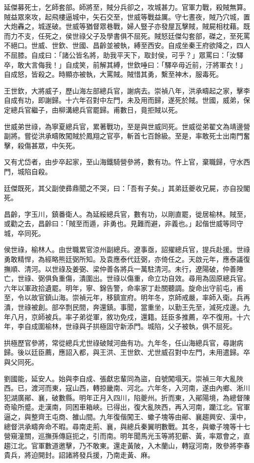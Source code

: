 \begin{pinyinscope}
延傑募死士，乞師套部。師將至，賊分兵卻之，攻城甚力。官軍力戰，殺賊無算。賊益眾來攻，起飛樓逼城中，矢石交至，世威等戰益厲。守七晝夜，賊乃穴城，置大炮轟之，城遂破。世威等猶督眾巷戰，婦人豎子亦發屋瓦擊賊，賊屍相枕藉。既而力不支，任死之，侯世祿父子及學書俱不屈死。賊怒廷傑勾套部，磔之，至死罵不絕口。世威、世欽、世國、昌齡並被執，縛至西安。自成坐秦王府欲降之，四人不屈膝。自成曰：「諸公皆名將，助我平天下，取封侯，可乎？」眾罵曰：「汝驛卒，敢大言侮我！」自成笑，前解其縛，世欽唾曰：「驛卒毋近前，汙將軍衣！」自成怒，皆殺之。時顯亦被執，大罵賊。賊惜其勇，繫至神木，服毒死。

王世欽，大將威子，歷山海左部總兵官，謝病去。崇禎八年，洪承疇起之家，擊李自成有功，即謝歸。十六年召對中左門，未及用而歸，遂死於賊。世國，威弟，保定總兵官繼子，由柳溝總兵官罷歸。甫數日，竟拒賊以死。

世威弟世祿，為寧夏總兵官，累著戰功，至是與世威同死。世威從弟翟文為靖邊營副將。嘗從洪承疇敗闖賊於鳳翔之官亭，斬首七百餘級。至是，率敢死士出南門奮擊，殺傷甚眾，中矢死。

又有尤岱者，由步卒起家，至山海鐵騎營參將，數有功。忤上官，棄職歸，守水西門，城陷自殺。

廷傑既死，其父副使彞鼎聞之不哭，曰：「吾有子矣。」其弟廷夔收兄屍，亦自投閣死。

昌齡，字玉川，鎮番衛人。為延綏總兵官，數有功，以剛直罷，徙居榆林。賊至，或勸之去，昌齡曰：「賊至而遁，非勇也。見難而避，非義也。」起偕世威等同守城，卒同死。

侯世祿，榆林人。由世職累官涼州副總兵。遼事亟，詔擢總兵官，提兵赴援。世祿勇敢精悍，為經略熊廷弼所知。及袁應泰代廷弼，亦倚任之。天啟元年，應泰議復撫順、清河。以世祿及姜弼、梁仲善各將兵一萬駐清河。未行，遼陽破，仲善陣亡，世祿、弼俱負重傷，潰圍出。世祿以傷重，命立功自效。尋用為固原總兵官。六年以軍政拾遺罷。明年，寧、錦告警，命率家丁赴關聽調。旋命出守前屯，甫至，令以故官鎮山海。崇禎元年，移鎮宣府。明年冬，京師戒嚴，率師入衛。兵再潰，世祿被創。部卒剽民間，奔還鎮。事聞，當重坐，以勤王先至，減死戍邊。九年八月，京師被兵。率子弟從軍，敘功免戍，還籍。廷臣多推薦，卒不復用。十六年，李自成圍榆林，世祿與子拱極固守新添門。城陷，父子被執，俱不屈死。

拱極歷官參將，常從總兵尤世祿破賊河曲有功。九年冬，任山海總兵官，尋謝病歸。後以廷臣薦，應詔入都，與王洪、王世欽、尤世威召對中左門，未用遣歸。卒與父同死。

劉國能，延安人。始與李自成、張獻忠輩同為盜，自號闖塌天。崇禎三年大亂陜西。已，渡河而東，寇山西，轉掠畿南、河北。六年冬，入河南，遂由內鄉、淅川犯湖廣鄖、襄，破數縣。明年正月入四川，陷夔州。折而東，入鄖陽境，為總督陳奇瑜所蹙。走漢南，同困車箱峽。已得出，復大亂陜西，再入河南，躪江北。官軍逼之，與整齊王屯商、雒山間。九年復偕闖王、蠍子塊等由鄖、襄趨興安、漢中，總督洪承疇奔命不暇。尋南走荊、襄，與總兵秦翼明數戰。其冬，與蠍子塊等十七營窺潼關，巡撫孫傳庭扼之，引而南。明年聞馬光玉等將犯蘄、黃，率眾會之，直趨江北。官軍數道邀擊，乃不敢東。還走黃陂，入木蘭山，轉寇河南，敗參將李春貴兵，將迫開封。詔諸將發兵援，乃南走黃、麻。


\end{pinyinscope}
